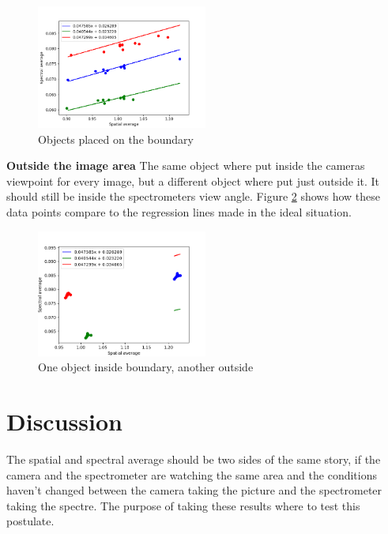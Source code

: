 \begin{figure}[h]
    \centering
    \includegraphics[width=0.5\textwidth]{Plots/spectral_vs_spatial_average_with_regression_boundary_objects.png}
    \caption{Objects placed on the boundary}
    \label{fig:boundary_objects_plot}
\end{figure}

\textbf{Outside the image area}
The same object where put inside the cameras viewpoint for every image, but a different object where put just outside it. It should still be inside the spectrometers view angle. Figure \ref{fig:outside_objects_plot} shows how these data points compare to the regression lines made in the ideal situation.

\begin{figure}[h]
    \centering
    \includegraphics[width=0.5\textwidth]{Plots/spectral_vs_spatial_average_with_regression_outside_objects.png}
    \caption{One object inside boundary, another outside}
    \label{fig:outside_objects_plot}
\end{figure}


\section{Discussion}
The spatial and spectral average should be two sides of the same story, if the camera and the spectrometer are watching the same area and the conditions haven't changed between the camera taking the picture and the spectrometer taking the spectre. The purpose of taking these results where to test this postulate. 

